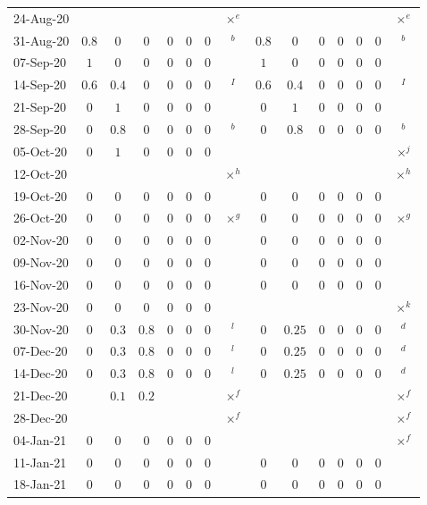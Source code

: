 \documentclass[fleqn,10pt]{wlscirep}
\begin{document}
\begin{table}
\begin{center}
{\begin{tabular}{l|ccccccc|ccccccc}
24-Aug-20	&	&	&	&	&	&	&$\times^{e}$		&	&	&	&	&	&	&$\times^{e}$	\\
31-Aug-20	&$0.8$	&$0$	&$0$	&$0$	&$0$	&$0$	&$^{b}$		&$0.8$	&$0$	&$0$	&$0$	&$0$	&$0$	&$^{b}$	\\
07-Sep-20	&$1$	&$0$	&$0$	&$0$	&$0$	&$0$	&		&$1$	&$0$	&$0$	&$0$	&$0$	&$0$	&	\\
14-Sep-20	&$0.6$	&$0.4$	&$0$	&$0$	&$0$	&$0$	&$^{I}$		&$0.6$	&$0.4$	&$0$	&$0$	&$0$	&$0$	&$^{I}$	\\
21-Sep-20	&$0$	&$1$	&$0$	&$0$	&$0$	&$0$	&		&$0$	&$1$	&$0$	&$0$	&$0$	&$0$	&	\\
28-Sep-20	&$0$	&$0.8$	&$0$	&$0$	&$0$	&$0$	&$^{b}$		&$0$	&$0.8$	&$0$	&$0$	&$0$	&$0$	&$^{b}$	\\
05-Oct-20	&$0$	&$1$	&$0$	&$0$	&$0$	&$0$	&		&	&	&	&	&	&	&$\times^{j}$	\\
12-Oct-20	&	&	&	&	&	&	&$\times^{h}$		&	&	&	&	&	&	&$\times^{h}$	\\
19-Oct-20	&$0$	&$0$	&$0$	&$0$	&$0$	&$0$	&		&$0$	&$0$	&$0$	&$0$	&$0$	&$0$	&	\\
26-Oct-20	&$0$	&$0$	&$0$	&$0$	&$0$	&$0$	&$\times^{g}$		&$0$	&$0$	&$0$	&$0$	&$0$	&$0$	&$\times^{g}$	\\
02-Nov-20	&$0$	&$0$	&$0$	&$0$	&$0$	&$0$	&		&$0$	&$0$	&$0$	&$0$	&$0$	&$0$	&	\\
09-Nov-20	&$0$	&$0$	&$0$	&$0$	&$0$	&$0$	&		&$0$	&$0$	&$0$	&$0$	&$0$	&$0$	&	\\
16-Nov-20	&$0$	&$0$	&$0$	&$0$	&$0$	&$0$	&		&$0$	&$0$	&$0$	&$0$	&$0$	&$0$	&	\\
23-Nov-20	&$0$	&$0$	&$0$	&$0$	&$0$	&$0$	&		&	&	&	&	&	&	&$\times^{k}$	\\
30-Nov-20	&$0$	&$0.3$	&$0.8$	&$0$	&$0$	&$0$	&$^{l}$		&$0$	&$0.25$	&$0$	&$0$	&$0$	&$0$	&$^{d}$	\\
07-Dec-20	&$0$	&$0.3$	&$0.8$	&$0$	&$0$	&$0$	&$^{l}$		&$0$	&$0.25$	&$0$	&$0$	&$0$	&$0$	&$^{d}$	\\
14-Dec-20	&$0$	&$0.3$	&$0.8$	&$0$	&$0$	&$0$	&$^{l}$		&$0$	&$0.25$	&$0$	&$0$	&$0$	&$0$	&$^{d}$	\\
21-Dec-20	&	&$0.1$	&$0.2$	&	&	&	&$\times^{f}$		&	&	&	&	&	&	&$\times^{f}$	\\
28-Dec-20	&	&	&	&	&	&	&$\times^{f}$		&	&	&	&	&	&	&$\times^{f}$	\\
04-Jan-21	&$0$	&$0$	&$0$	&$0$	&$0$	&$0$	&		&	&	&	&	&	&	&$\times^{f}$	\\
11-Jan-21	&$0$	&$0$	&$0$	&$0$	&$0$	&$0$	&		&$0$	&$0$	&$0$	&$0$	&$0$	&$0$	&	\\
18-Jan-21	&$0$	&$0$	&$0$	&$0$	&$0$	&$0$	&		&$0$	&$0$	&$0$	&$0$	&$0$	&$0$	&	\\

\end{tabular}}
\end{center}
\end{table}
\end{document}
